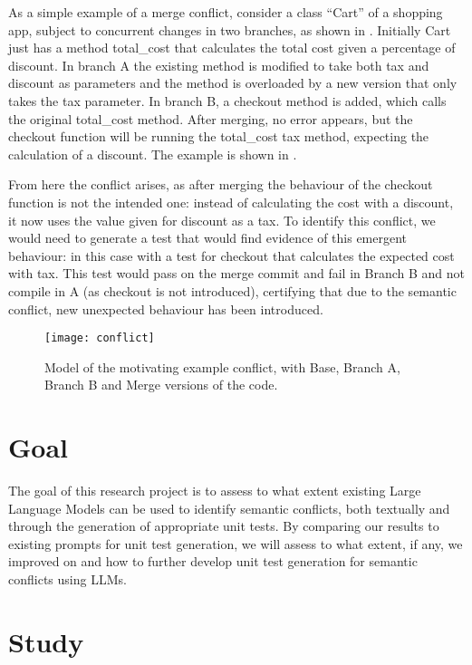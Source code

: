 As a simple example of a merge conflict, consider a class ``Cart'' of a shopping app, subject to concurrent changes in two branches, as shown in .
Initially Cart just has a method total\_cost that calculates the total cost given a percentage of discount.
In branch A the existing method is modified to take both tax and discount as parameters and the method is overloaded by a new version that only takes the tax parameter.
In branch B, a checkout method is added, which calls the original total\_cost method. After merging, no error appears, but the checkout function will be running the total\_cost tax method, expecting the calculation of a discount. The example is shown in .

From here the conflict arises, as after merging the behaviour of the checkout function is not the intended one: instead of calculating the cost with a discount, it now uses the value given for discount as a tax.
To identify this conflict, we would need to generate a test that would find evidence of this emergent behaviour: in this case with a test for checkout that calculates the expected cost with tax. This test would pass on the merge commit and fail in Branch B and not compile in A (as checkout is not introduced),
certifying that due to the semantic conflict, new unexpected behaviour has been introduced.

\begin{figure}[t]
    \texttt{[image: conflict]}
    \caption{Model of the motivating example conflict, with Base, Branch A, Branch B and Merge versions of the code.}
    \label{fig:conflict}
\end{figure}

\section{Goal} \label{sec:goal}

The goal of this research project is to assess to what extent existing Large Language Models can be used to identify semantic conflicts, both textually and through the generation
of appropriate unit tests. By comparing our results to existing prompts for unit test generation, we will assess to what extent, if any, we improved on and how to further develop
unit test generation for semantic conflicts using LLMs.
\section{Study} \label{sec:study}

